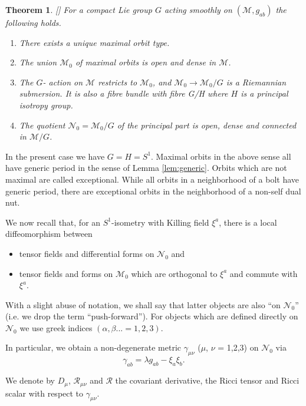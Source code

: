 \documentclass[a4paper,11pt,reqno]{amsart}
\newcommand{\cR}{\mathcal{R}}
\newcommand{\cM}{\mathcal{M}}
\newcommand{\cN}{\mathcal{N}}
\newcommand{\al}{\alpha}
\newcommand{\be}{\beta}
\theoremstyle{plain}
\newtheorem{thm}{Theorem}[section]
\numberwithin{equation}{section}
\begin{document}
\begin{thm}
\label{thm:quot}[\cite{MR889050}] 
For a compact Lie group $G$ acting smoothly on $(\cM, g_{ab})$ the following holds.  
\begin{enumerate}
\item There exists a unique maximal  orbit type.
\item The union $\cM_0$ of maximal orbits is open and dense  in $\cM$.
\item The $G$- action on $\cM$ restricts to $\cM_0$, and  $\cM_0 \rightarrow \cM_0 /G $
is a Riemannian submersion. It is also a fibre bundle with fibre G/H where $H$ is a principal isotropy group.
\item The quotient $\cN_0= \cM_0 /G$ of the principal part is open, dense and connected in $\cM /G $.
\end{enumerate} 

\end{thm}

In the present case we  have $G = H = S^1$.  
Maximal orbits in the above sense  all have generic period in the sense of Lemma \ref{lem:generic}.  
Orbits which are not maximal are called exceptional.
While all orbits in a neighborhood of a bolt have generic period, there are exceptional orbits in the neighborhood of a non-self dual nut. 

%

 We now recall \cite{1971JMP....12..918G} that, for an $S^1$-isometry with Killing field $\xi^a$,  there is a local diffeomorphism between 
\begin{itemize} 
\item  tensor fields and differential forms on $\cN_0$ and 
\item 
 tensor fields and forms on $\cM_0$ which are orthogonal to $\xi^a$ and  commute with  $\xi^a$.
 \end{itemize}
 With a slight abuse of notation, we shall say that latter  objects are also ``on  $\cN_{0}$''  (i.e. we drop the term ``push-forward'').
 For objects which are defined directly  on $\cN_0$ we use greek indices $(\al, \be...= 1,2,3)$. 

   In particular, we obtain a non-degenerate metric 
$\gamma_{\mu\nu}$ ($\mu$, $\nu$ = 1,2,3) on $\cN_0$ via
\begin{equation}
\gamma_{ab} = \lambda g_{ab} - \xi_{a}\xi_{b}.
\label{2Gamma}
\end{equation}

We denote by $D_{\mu}$, $\cR_{\mu\nu}$ and $\cR$ the covariant derivative,
the Ricci tensor and Ricci scalar with respect to $\gamma_{\mu\nu}$.
\end{document}
